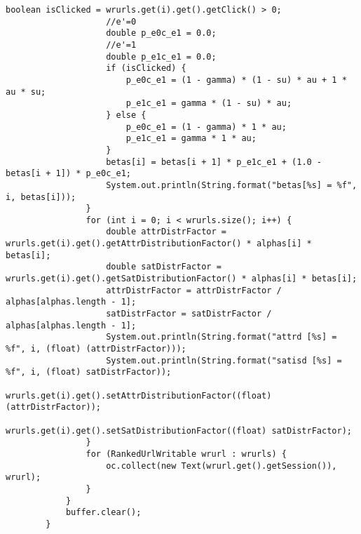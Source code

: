 \begin{lstlisting}[style=java,caption=Dynamic Bayes Network. M step]
                    boolean isClicked = wrurls.get(i).get().getClick() > 0;
                    //e'=0
                    double p_e0c_e1 = 0.0;
                    //e'=1
                    double p_e1c_e1 = 0.0;
                    if (isClicked) {
                        p_e0c_e1 = (1 - gamma) * (1 - su) * au + 1 * au * su;
                        p_e1c_e1 = gamma * (1 - su) * au;
                    } else {
                        p_e0c_e1 = (1 - gamma) * 1 * au;
                        p_e1c_e1 = gamma * 1 * au;
                    }
                    betas[i] = betas[i + 1] * p_e1c_e1 + (1.0 - betas[i + 1]) * p_e0c_e1;
                    System.out.println(String.format("betas[%s] = %f", i, betas[i]));
                }
                for (int i = 0; i < wrurls.size(); i++) {
                    double attrDistrFactor = wrurls.get(i).get().getAttrDistributionFactor() * alphas[i] * betas[i];
                    double satDistrFactor = wrurls.get(i).get().getSatDistributionFactor() * alphas[i] * betas[i];
                    attrDistrFactor = attrDistrFactor / alphas[alphas.length - 1];
                    satDistrFactor = satDistrFactor / alphas[alphas.length - 1];
                    System.out.println(String.format("attrd [%s] = %f", i, (float) (attrDistrFactor)));
                    System.out.println(String.format("satisd [%s] = %f", i, (float) satDistrFactor));
                    wrurls.get(i).get().setAttrDistributionFactor((float) (attrDistrFactor));
                    wrurls.get(i).get().setSatDistributionFactor((float) satDistrFactor);
                }
                for (RankedUrlWritable wrurl : wrurls) {
                    oc.collect(new Text(wrurl.get().getSession()), wrurl);
                }
            }
            buffer.clear();
        }

\end{lstlisting}